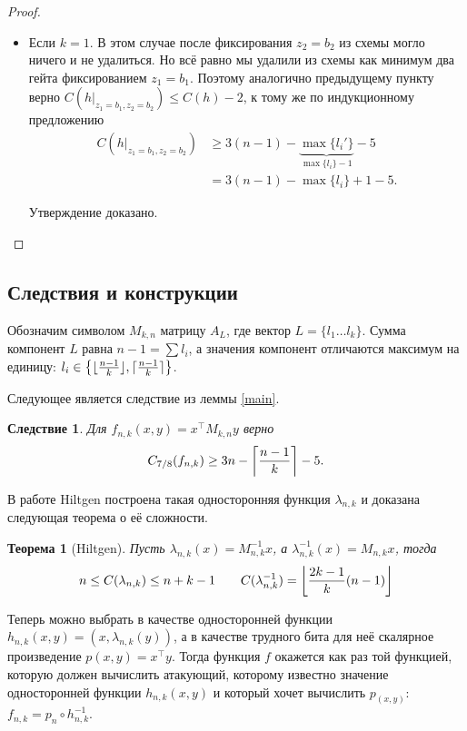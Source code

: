 \documentclass[oneside, a4paper]{article}
\newtheorem{theorem}{Теорема}
\newtheorem{corollary}{Следствие}
\theoremstyle{definition}
\theoremstyle{remark}
\DeclarePairedDelimiter\floor{\lfloor}{\rfloor}
\DeclarePairedDelimiter\ceil{\lceil}{\rceil}
\begin{document}
\begin{proof}
\begin{itemize}
\item Если $k = 1$. В этом случае после фиксирования $z_2 = b_2$ из схемы могло
ничего и не удалиться. Но всё равно мы удалили из схемы как минимум два гейта
фиксированием $z_1 = b_1$. Поэтому аналогично предыдущему пункту верно $C(h
\rvert _ {z_1 = b_1, z_2 = b_2}) \leq C(h) - 2$, к тому же по индукционному
предложению
\[
\begin{aligned}
C(h \rvert _ {z_1 = b_1, z_2 = b_2}) &\geq 3(n - 1) - \underbrace{\max \{l_i'\}}_{\max \{l_i\} - 1} - 5 \\
&= 3(n - 1) - \max \{l_i\} + 1 - 5.
\end{aligned}
\]

Утверждение доказано.
\end{itemize}
\end{proof}

\subsection{Следствия и конструкции}
Обозначим символом $M_{k, n}$ матрицу $A_L$, где вектор $L = \{l_1 \dots l_k\}$.
Сумма компонент $L$ равна $n - 1 = \sum l_i$, а значения компонент отличаются
максимум на единицу: $l_i \in \left \{ \floor{\frac {n - 1} k}, \ceil{\frac {n -
1} k} \right\}$.

Следующее является следствие из леммы \ref{main}.

\begin{corollary}
Для $f_{n, k}(x, y) = x^\top M_{k, n} y$ верно
\[
C_{7/8}(f_{n, k}) \geq 3n - \ceil*{\frac {n - 1} k} - 5.
\]
\end{corollary}

В работе Hiltgen \cite[p.~63]{hiltgen} построена такая односторонняя функция
$\lambda_{n ,k}$ и доказана следующая теорема о её сложности.

\begin{theorem}[Hiltgen]
Пусть $\lambda_{n, k}(x) = M_{n, k}^{-1} x$, а $\lambda^{-1}_{n, k}(x) = M_{n,
k} x$, тогда
\[
n \leq C(\lambda_{n, k}) \leq n + k - 1 \quad \quad C(\lambda_{n, k}^{-1}) = \floor*{ \frac {2k - 1} k (n - 1) }
\]
\end{theorem}

Теперь можно выбрать в качестве односторонней функции $h_{n,k}(x, y) = (x,
\lambda_{n, k}(y))$, а в качестве трудного бита для неё скалярное произведение
$p(x, y) = x^\top y$. Тогда функция $f$ окажется как раз той функцией, которую
должен вычислить атакующий, которому известно значение односторонней функции
$h_{n, k}(x, y)$ и который хочет вычислить $p_(x, y)$: $f_{n, k} = p_n \circ h_{n,
k}^{-1}$.
\end{document}
